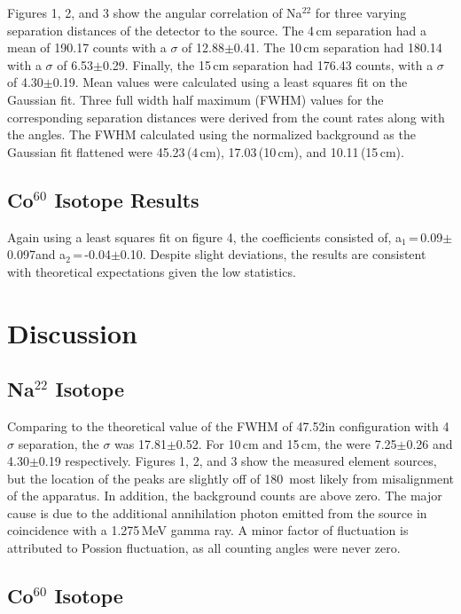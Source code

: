 \documentclass[aps,prl,twocolumn,superscriptaddress]{revtex4-1}
\begin{document}
Figures 1, 2, and 3 show the angular correlation of Na$^{22}$ for three varying separation distances of the detector to the source. The 4\,cm separation had a mean of 190.17 counts with a $\sigma$ of 12.88$\pm$0.41. The 10\,cm separation had 180.14 with a $\sigma$ of 6.53$\pm$0.29. Finally, the 15\,cm separation had 176.43 counts, with a $\sigma$ of 4.30$\pm$0.19. Mean values were calculated using a least squares fit on the Gaussian fit. Three full width half maximum (FWHM) values for the corresponding separation distances were derived from the count rates along with the angles. The FWHM calculated using the normalized background as the Gaussian fit flattened were 45.23\degree\,(4\,cm), 17.03\degree\,(10\,cm), and 10.11\degree\,(15\,cm). 

\subsection{Co$^{60}$ Isotope Results}



Again using a least squares fit on figure 4, the coefficients consisted of, a$_1$\,=\,0.09\degree$\pm$0.097\degree and a$_2$\,=\,-0.04\degree$\pm$0.10\degree. Despite slight deviations, the results are consistent with theoretical expectations given the low statistics. 


\section{Discussion}


\subsection{Na$^{22}$ Isotope}
Comparing to the theoretical value of the FWHM of 47.52\degree in configuration with 4\,$\sigma$ separation, the $\sigma$ was 17.81$\pm$0.52. For 10\,cm and 15\,cm, the were 7.25$\pm$0.26 and 4.30$\pm$0.19 respectively. Figures 1, 2, and 3 show the measured element sources, but the location of the peaks are slightly off of 180\degree\, most likely from misalignment of the apparatus. In addition, the background counts are above zero. The major cause is due to the additional annihilation photon emitted from the source in coincidence with a 1.275\,MeV gamma ray. A minor factor of fluctuation is attributed to Possion fluctuation, as all counting angles were never zero.

\subsection{Co$^{60}$ Isotope}
\end{document}
